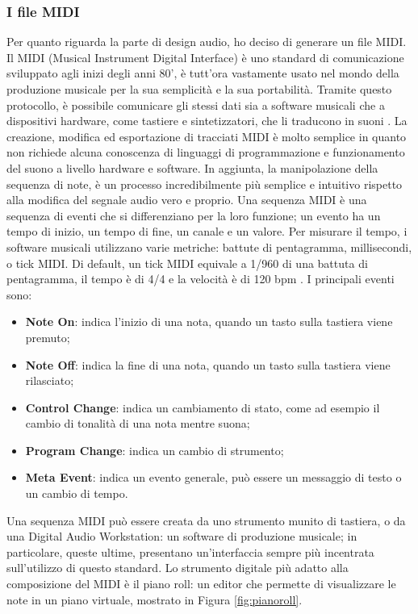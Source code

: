 \subsubsection{I file MIDI}
Per quanto riguarda la parte di design audio, ho deciso di generare un file MIDI.
Il MIDI (Musical Instrument Digital Interface) è uno standard di comunicazione sviluppato agli inizi degli anni 80', è tutt'ora vastamente usato nel mondo della produzione musicale per la sua semplicità e la sua portabilità.
Tramite questo protocollo, è possibile comunicare gli stessi dati sia a software musicali che a dispositivi hardware, come tastiere e sintetizzatori, che li traducono in suoni \cite{midi}.
La creazione, modifica ed esportazione di tracciati MIDI è molto semplice in quanto non richiede alcuna conoscenza di linguaggi di programmazione e funzionamento del suono a livello hardware e software.
In aggiunta, la manipolazione della sequenza di note, è un processo incredibilmente più semplice e intuitivo rispetto alla modifica del segnale audio vero e proprio.
Una sequenza MIDI è una sequenza di eventi che si differenziano per la loro funzione; un evento ha un tempo di inizio, un tempo di fine, un canale e un valore.
Per misurare il tempo, i software musicali utilizzano varie metriche: battute di pentagramma, millisecondi, o tick MIDI.
Di default, un tick MIDI equivale a 1/960 di una battuta di pentagramma, il tempo è di 4/4 e la velocità è di 120 bpm \cite{midi}.
I principali eventi sono:
\begin{itemize}
    \item \textbf{Note On}: indica l'inizio di una nota, quando un tasto sulla tastiera viene premuto;
    \item \textbf{Note Off}: indica la fine di una nota, quando un tasto sulla tastiera viene rilasciato;
    \item \textbf{Control Change}: indica un cambiamento di stato, come ad esempio il cambio di tonalità di una nota mentre suona;
    \item \textbf{Program Change}: indica un cambio di strumento;
    \item \textbf{Meta Event}: indica un evento generale, può essere un messaggio di testo o un cambio di tempo.
\end{itemize}
Una sequenza MIDI può essere creata da uno strumento munito di tastiera, o da una Digital Audio Workstation: un software di produzione musicale; in particolare, queste ultime, presentano un'interfaccia sempre più incentrata sull'utilizzo di questo standard.
Lo strumento digitale più adatto alla composizione del MIDI è il piano roll: un editor che permette di visualizzare le note in un piano virtuale, mostrato in Figura \ref{fig:pianoroll}. 
